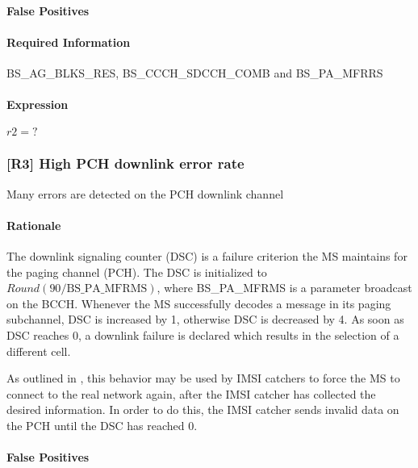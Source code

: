 \documentclass[a4paper,11pt,notitlepage,bigheadings,oneside]{scrartcl}
\begin{document}
\paragraph{False Positives}


\paragraph{Required Information}

BS\_AG\_BLKS\_RES, BS\_CCCH\_SDCCH\_COMB and BS\_PA\_MFRRS


\paragraph{Expression}

$r2 = ?$

\subsubsection{[R3] High PCH downlink error rate}

Many errors are detected on the PCH downlink channel

\paragraph{Rationale}

The downlink signaling counter (DSC) is a failure criterion the MS maintains
for the paging channel (PCH). The DSC is initialized to
$Round(90/\text{BS\_PA\_MFRMS})$, where BS\_PA\_MFRMS is a parameter broadcast
on the BCCH. Whenever the MS successfully decodes a message in its paging
subchannel, DSC is increased by 1, otherwise DSC is decreased by 4. As soon as
DSC reaches 0, a downlink failure is declared which results in the selection of
a different cell.

As outlined in \cite{bott2000verfahren}, this behavior may be used by IMSI
catchers to force the MS to connect to the real network again, after the IMSI
catcher has collected the desired information. In order to do this, the IMSI
catcher sends invalid data on the PCH until the DSC has reached 0.

\paragraph{False Positives}
\end{document}
